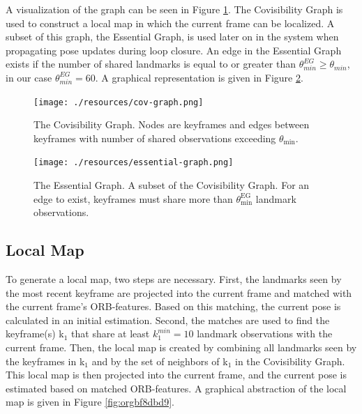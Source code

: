 \documentclass[a4paper, 10pt]{article}
\begin{document}
A visualization of the graph can be seen in Figure \ref{fig:org7838166}. The Covisibility Graph is used to construct a local map in which the current frame can be localized.
A subset of this graph, the Essential Graph, is used later on in the system when propagating pose updates during loop closure. An edge in the Essential Graph exists if the number of shared landmarks is 
equal to or greater than \(\theta_{min}^{EG} \geq \theta_{min}\), in our case \(\theta_{min}^{EG}=60\). A graphical representation is given in Figure \ref{fig:org293b31c}.

\begin{figure}[htbp]
\centering
\texttt{[image: ./resources/cov-graph.png]}
\caption{\label{fig:org7838166}
The Covisibility Graph. Nodes are keyframes and edges between keyframes with number of shared observations exceeding \(\theta_{\text{min}}\).}
\end{figure}

\begin{figure}[htbp]
\centering
\texttt{[image: ./resources/essential-graph.png]}
\caption{\label{fig:org293b31c}
The Essential Graph. A subset of the Covisibility Graph. For an edge to exist, keyframes must share more than \(\theta_{\text{min}}^{\text{EG}}\) landmark observations.}
\end{figure}

\subsection{Local Map}
\label{sec:org77aa4ac}
To generate a local map, two steps are necessary. First, the landmarks seen by the most recent keyframe are projected into the current frame and matched with the current frame’s ORB-features.
Based on this matching, the current pose is calculated in an initial estimation. Second, the matches are used to find the keyframe(s) k\(_{\text{1}}\) that share at least \(k_1^{min}=10\) landmark observations with the current frame.
Then, the local map is created by combining all landmarks seen by the keyframes in k\(_{\text{1}}\) and by the set of neighbors of k\(_{\text{1}}\) in the Covisibility Graph.
This local map is then projected into the current frame, and the current pose is estimated based on matched ORB-features. A graphical abstraction of the local map is given in Figure \ref{fig:orgbf8dbd9}.
\end{document}
